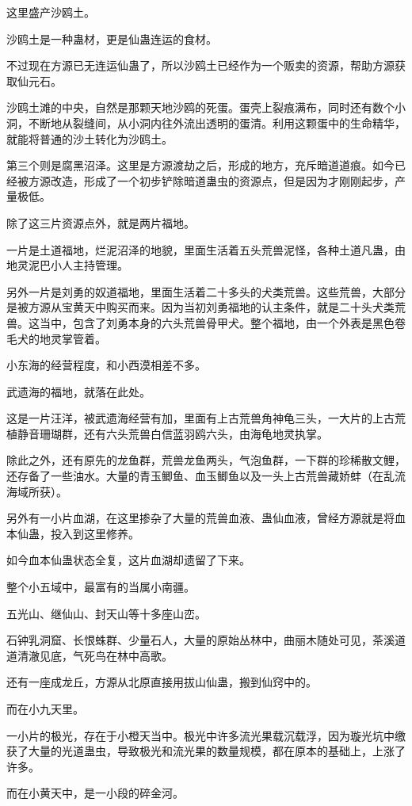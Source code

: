 \begin{this_body}
这里盛产沙鸥土。

沙鸥土是一种蛊材，更是仙蛊连运的食材。

不过现在方源已无连运仙蛊了，所以沙鸥土已经作为一个贩卖的资源，帮助方源获取仙元石。

沙鸥土滩的中央，自然是那颗天地沙鸥的死蛋。蛋壳上裂痕满布，同时还有数个小洞，不断地从裂缝间，从小洞内往外流出透明的蛋清。利用这颗蛋中的生命精华，就能将普通的沙土转化为沙鸥土。

第三个则是腐黑沼泽。这里是方源渡劫之后，形成的地方，充斥暗道道痕。如今已经被方源改造，形成了一个初步铲除暗道蛊虫的资源点，但是因为才刚刚起步，产量极低。

除了这三片资源点外，就是两片福地。

一片是土道福地，烂泥沼泽的地貌，里面生活着五头荒兽泥怪，各种土道凡蛊，由地灵泥巴小人主持管理。

另外一片是刘勇的奴道福地，里面生活着二十多头的犬类荒兽。这些荒兽，大部分是被方源从宝黄天中购买而来。因为当初刘勇福地的认主条件，就是二十头犬类荒兽。这当中，包含了刘勇本身的六头荒兽骨甲犬。整个福地，由一个外表是黑色卷毛犬的地灵掌管着。

小东海的经营程度，和小西漠相差不多。

武遗海的福地，就落在此处。

这是一片汪洋，被武遗海经营有加，里面有上古荒兽角神龟三头，一大片的上古荒植静音珊瑚群，还有六头荒兽白信蓝羽鸥六头，由海龟地灵执掌。

除此之外，还有原先的龙鱼群，荒兽龙鱼两头，气泡鱼群，一下群的珍稀散文鲤，还存备了一些油水。大量的青玉鲫鱼、血玉鲫鱼以及一头上古荒兽藏娇蚌（在乱流海域所获）。

另外有一小片血湖，在这里掺杂了大量的荒兽血液、蛊仙血液，曾经方源就是将血本仙蛊，投入到这里修养。

如今血本仙蛊状态全复，这片血湖却遗留了下来。

整个小五域中，最富有的当属小南疆。

五光山、继仙山、封天山等十多座山峦。

石钟乳洞窟、长恨蛛群、少量石人，大量的原始丛林中，曲丽木随处可见，茶溪道道清澈见底，气死鸟在林中高歌。

还有一座成龙丘，方源从北原直接用拔山仙蛊，搬到仙窍中的。

而在小九天里。

一小片的极光，存在于小橙天当中。极光中许多流光果载沉载浮，因为璇光坑中缴获了大量的光道蛊虫，导致极光和流光果的数量规模，都在原本的基础上，上涨了许多。

而在小黄天中，是一小段的碎金河。


\end{this_body}
